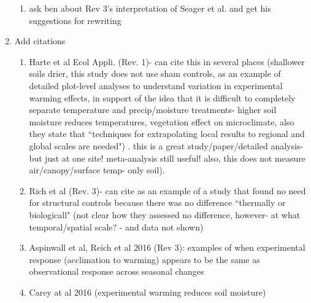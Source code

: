 \documentclass[12pt,a4paper]{article}
\begin{document}
\begin{enumerate}
\begin{enumerate}
\item ask ben about Rev 3's interpretation of Seager et al. and get his suggestions for rewriting
\end{enumerate}
\item Add citations 
\begin{enumerate}
\item Harte et al Ecol Appli. (Rev. 1)- can cite this in several places (shallower soils drier, this study does not use sham controls, as an example of detailed plot-level analyses to understand variation in experimental warming effects, in support of the idea that it is difficult to completely separate temperature and precip/moisture treatments- higher soil moisture reduces temperatures, vegetation effect on microclimate, also they state that ``techniques for extrapolating local results to regional and global scales are needed") . this is a great study/paper/detailed analysis- but just at one site! meta-analysis still useful! also, this does not measure air/canopy/surface temp- only soil). 
\item Rich et al (Rev. 3)- can cite as an example of a study that found no need for structural controls because there was no difference ``thermally or biologicall" (not clear how they assessed no difference, however- at what temporal/spatial scale? - and data not shown)
\item Aspinwall et al, Reich et al 2016 (Rev 3): examples of when experimental response (acclimation to warming) appears to be the same as observational response across seasonal changes
\item Carey at al 2016 (experimental warming reduces soil moisture)
\end{enumerate}


\end{enumerate}
\end{document}
